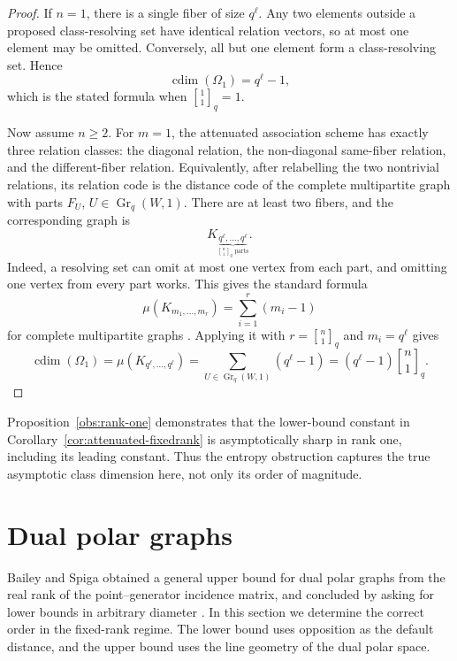 \documentclass[11pt]{article}
\theoremstyle{definition}
\theoremstyle{remark}
\newcommand{\Gr}{\operatorname{Gr}}
\newcommand{\cdim}{\operatorname{cdim}}
\newcommand{\qbinom}[2]{\genfrac{[}{]}{0pt}{}{#1}{#2}_q}
\begin{document}
\begin{proof}
If \(n=1\), there is a single fiber of size \(q^\ell\).  Any two elements
outside a proposed class-resolving set have identical relation vectors, so
at most one element may be omitted.  Conversely, all but one element form
a class-resolving set.  Hence
\[
        \cdim(\Omega_1)=q^\ell-1,
\]
which is the stated formula when \(\qbinom11=1\).

Now assume \(n\geq2\).  For \(m=1\), the attenuated association scheme has
exactly three relation classes: the diagonal relation, the non-diagonal
same-fiber relation, and the different-fiber relation.  Equivalently, after
relabelling the two nontrivial relations, its relation code is the distance
code of the complete multipartite graph with parts \(F_U\),
\(U\in\Gr_q(W,1)\).  There are at least two fibers, and the corresponding
graph is
\[
        K_{\underbrace{q^\ell,\ldots,q^\ell}_{\qbinom n1\text{ parts}}}.
\]
Indeed, a resolving set can omit at most one vertex from each part, and
omitting one vertex from every part works.  This gives the standard formula
\[
        \mu(K_{m_1,\ldots,m_r})=\sum_{i=1}^r (m_i-1)
\]
for complete multipartite graphs 
\cite[Proposition~1]{BaileySmallDistanceRegular}.
Applying it with \(r=\qbinom n1\) and \(m_i=q^\ell\) gives
\[
        \cdim(\Omega_1)
        =
        \mu(K_{q^\ell,\ldots,q^\ell})
        =
        \sum_{U\in \Gr_q(W,1)} (q^\ell-1)
        =
        (q^\ell-1)\qbinom n1.
\]
\end{proof}

Proposition~\ref{obs:rank-one} demonstrates that the lower-bound constant
in Corollary~\ref{cor:attenuated-fixedrank} is asymptotically sharp in rank
one, including its leading constant.  Thus the entropy obstruction captures
the true asymptotic class dimension here, not only its order of magnitude.

\section{Dual polar graphs}\label{sec:dualpolar}

Bailey and Spiga obtained a general upper bound for dual polar graphs from
the real rank of the point--generator incidence matrix, and concluded by
asking for lower bounds in arbitrary diameter \cite{BaileySpiga}.  In this 
section we determine the correct order in the fixed-rank regime.  The 
lower bound uses opposition as the default distance, and the upper bound 
uses the line geometry of the dual polar space.
\end{document}
